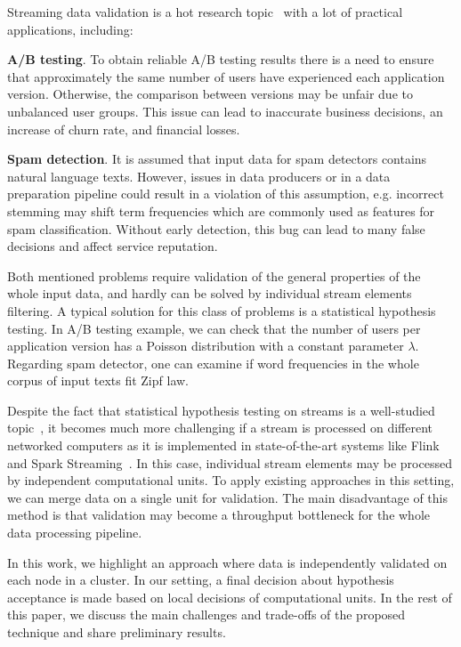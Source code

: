 \label {fs-short-intro}

Streaming data validation is a hot research topic~\cite{Xu:2013:MVS:2488222.2488275, frank2018semantic} with a lot of practical applications, including:

{\bf A/B testing}. To obtain reliable A/B testing results there is a need to ensure that approximately the same number of users have experienced each application version. Otherwise, the comparison between versions may be unfair due to unbalanced user groups. This issue can lead to inaccurate business decisions, an increase of churn rate, and financial losses.
    
{\bf Spam detection}. It is assumed that input data for spam detectors contains natural language texts. However, issues in data producers or in a data preparation pipeline could result in a violation of this assumption, e.g. incorrect stemming may shift term frequencies which are commonly used as features for spam classification. Without early detection, this bug can lead to many false decisions and affect service reputation.

Both mentioned problems require validation of the general properties of the whole input data, and hardly can be solved by individual stream elements filtering. A typical solution for this class of problems is a statistical hypothesis testing. In A/B testing example, we can check that the number of users per application version has a Poisson distribution with a constant parameter $\lambda$. Regarding spam detector, one can examine if word frequencies in the whole corpus of input texts fit Zipf law. 

Despite the fact that statistical hypothesis testing on streams is a well-studied topic~\cite{kifer2004detecting, lall2015data}, it becomes much more challenging if a stream is processed on different networked computers as it is implemented in state-of-the-art systems like Flink~\cite{Carbone:2017:SMA:3137765.3137777} and Spark Streaming~\cite{Zaharia:2012:DSE:2342763.2342773}. In this case, individual stream elements may be processed by independent computational units. To apply existing approaches in this setting, we can merge data on a single unit for validation. The main disadvantage of this method is that validation may become a throughput bottleneck for the whole data processing pipeline. 

In this work, we highlight an approach where data is independently validated on each node in a cluster. In our setting, a final decision about hypothesis acceptance is made based on local decisions of computational units. In the rest of this paper, we discuss the main challenges and trade-offs of the proposed technique and share preliminary results.